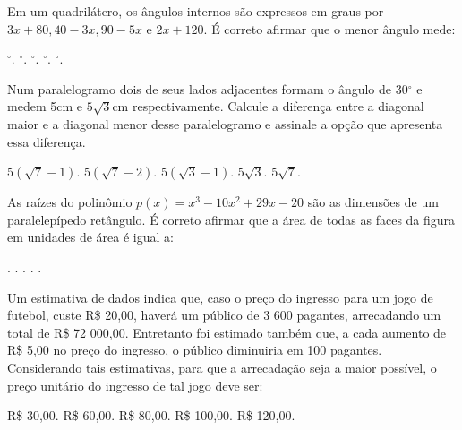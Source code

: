 \begin{question}%
Em um quadrilátero, os ângulos internos são expressos em graus por \(3x + 80, 40 - 3x, 90-5x\) e \(2x + 120\). É correto afirmar que o menor ângulo mede:
    \begin{tasks}
        \(^\circ\).
        \(^\circ\).
        \(^\circ\).
        \(^\circ\).
        \(^\circ\).
    \end{tasks}
\end{question}

\begin{question}%
Num paralelogramo dois de seus lados adjacentes formam o ângulo de 30\(^\circ\) e medem 5cm e \(5\sqrt{3}\)cm respectivamente. Calcule a diferença entre a diagonal maior e a diagonal menor desse paralelogramo e assinale a opção que apresenta essa diferença.
    \begin{tasks}
        \task \(5(\sqrt{7} - 1)\).
        \task \(5(\sqrt{7} - 2)\).
        \task \(5(\sqrt{3} - 1)\).
        \task \(5\sqrt{3}\).
        \task \(5\sqrt{7}\).
    \end{tasks}
\end{question}

\begin{question}%
As raízes do polinômio \(p(x) = x^3 -10x^2 + 29x - 20\) são as dimensões de um paralelepípedo retângulo. É correto afirmar que a área de todas as faces da figura em unidades de área é igual a:
    \begin{tasks}
        .
        .
        .
        .
        .
    \end{tasks}
\end{question}

\begin{question}%
Um estimativa de dados indica que, caso o preço do ingresso para um jogo de futebol, custe R\$ 20,00, haverá um público de 3 600 pagantes, arrecadando um total de R\$ 72 000,00. Entretanto foi estimado também que, a cada aumento de R\$ 5,00 no preço do ingresso, o público diminuiria em 100 pagantes. Considerando tais estimativas, para que a arrecadação seja a maior possível, o preço unitário do ingresso de tal jogo deve ser:
    \begin{tasks}
        \task R\$ 30,00.
        \task R\$ 60,00.
        \task R\$ 80,00.
        \task R\$ 100,00.
        \task R\$ 120,00.
    \end{tasks}
\end{question}

